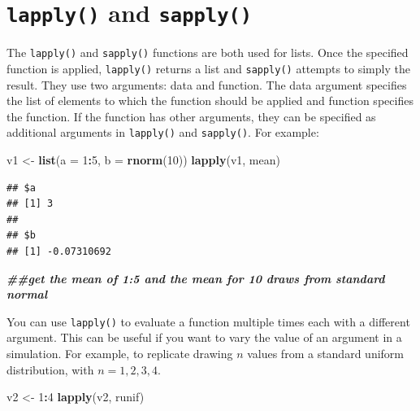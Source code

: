 \documentclass[
]{book}
\newenvironment{Shaded}{\begin{snugshade}}{\end{snugshade}}
\newcommand{\AttributeTok}[1]{\textcolor[rgb]{0.13,0.29,0.53}{#1}}
\newcommand{\DecValTok}[1]{\textcolor[rgb]{0.00,0.00,0.81}{#1}}
\newcommand{\DocumentationTok}[1]{\textcolor[rgb]{0.56,0.35,0.01}{\textbf{\textit{#1}}}}
\newcommand{\FunctionTok}[1]{\textcolor[rgb]{0.13,0.29,0.53}{\textbf{#1}}}
\newcommand{\NormalTok}[1]{#1}
\newcommand{\OtherTok}[1]{\textcolor[rgb]{0.56,0.35,0.01}{#1}}
\newcommand{\SpecialCharTok}[1]{\textcolor[rgb]{0.81,0.36,0.00}{\textbf{#1}}}
\theoremstyle{definition}
\theoremstyle{definition}
\theoremstyle{definition}
\theoremstyle{definition}
\theoremstyle{remark}
\begin{document}
\hypertarget{lapply-and-sapply}{%
\section{\texorpdfstring{\texttt{lapply()} and \texttt{sapply()}}{lapply() and sapply()}}\label{lapply-and-sapply}}

The \texttt{lapply()} and \texttt{sapply()} functions are both used for lists. Once the specified function is applied, \texttt{lapply()} returns a list and \texttt{sapply()} attempts to simply the result. They use two arguments: data and function. The data argument specifies the list of elements to which the function should be applied and function specifies the function. If the function has other arguments, they can be specified as additional arguments in \texttt{lapply()} and \texttt{sapply()}. For example:

\begin{Shaded}
\begin{Highlighting}[]
\NormalTok{v1 }\OtherTok{\textless{}{-}} \FunctionTok{list}\NormalTok{(}\AttributeTok{a =} \DecValTok{1}\SpecialCharTok{:}\DecValTok{5}\NormalTok{, }\AttributeTok{b =} \FunctionTok{rnorm}\NormalTok{(}\DecValTok{10}\NormalTok{))}
\FunctionTok{lapply}\NormalTok{(v1, mean)}
\end{Highlighting}
\end{Shaded}

\begin{verbatim}
## $a
## [1] 3
## 
## $b
## [1] -0.07310692
\end{verbatim}

\begin{Shaded}
\begin{Highlighting}[]
\DocumentationTok{\#\#get the mean of 1:5 and the mean for 10 draws from standard normal}
\end{Highlighting}
\end{Shaded}

You can use \texttt{lapply()} to evaluate a function multiple times each with a different argument. This can be useful if you want to vary the value of an argument in a simulation. For example, to replicate drawing \(n\) values from a standard uniform distribution, with \(n = 1, 2, 3, 4\).

\begin{Shaded}
\begin{Highlighting}[]
\NormalTok{v2 }\OtherTok{\textless{}{-}} \DecValTok{1}\SpecialCharTok{:}\DecValTok{4}
\FunctionTok{lapply}\NormalTok{(v2, runif)}
\end{Highlighting}
\end{Shaded}
\end{document}
